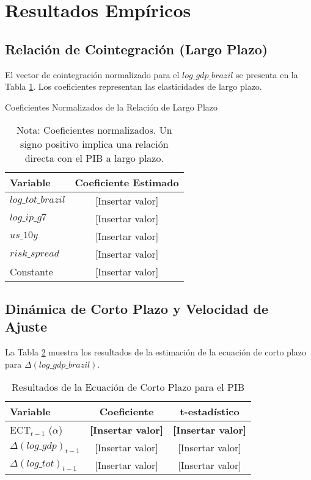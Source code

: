 \documentclass[12pt, a4paper]{article}
\begin{document}
\section{Resultados Empíricos}

\subsection{Relación de Cointegración (Largo Plazo)}
El vector de cointegración normalizado para el $log\_gdp\_brazil$ se presenta en la Tabla \ref{tab:long_run}. Los coeficientes representan las elasticidades de largo plazo.

\begin{table}[h!]
\centering
\caption{Coeficientes Normalizados de la Relación de Largo Plazo}
\label{tab:long_run}
\begin{tabular}{lc}
\toprule
\textbf{Variable} & \textbf{Coeficiente Estimado} \\
\midrule
$log\_tot\_brazil$ & [Insertar valor] \\
$log\_ip\_g7$      & [Insertar valor] \\
$us\_10y$          & [Insertar valor] \\
$risk\_spread$     & [Insertar valor] \\
Constante        & [Insertar valor] \\
\bottomrule
\end{tabular}
\caption*{Nota: Coeficientes normalizados. Un signo positivo implica una relación directa con el PIB a largo plazo.}
\end{table}


\subsection{Dinámica de Corto Plazo y Velocidad de Ajuste}
La Tabla \ref{tab:short_run} muestra los resultados de la estimación de la ecuación de corto plazo para $\Delta(log\_gdp\_brazil)$.

\begin{table}[h!]
\centering
\caption{Resultados de la Ecuación de Corto Plazo para el PIB}
\label{tab:short_run}
\begin{tabular}{lcc}
\toprule
\textbf{Variable} & \textbf{Coeficiente} & \textbf{t-estadístico} \\
\midrule
ECT$_{t-1}$ ($\alpha$) & \textbf{[Insertar valor]} & \textbf{[Insertar valor]} \\
$\Delta(log\_gdp)_{t-1}$ & [Insertar valor] & [Insertar valor] \\
$\Delta(log\_tot)_{t-1}$ & [Insertar valor] & [Insertar valor] \\
\bottomrule
\end{tabular}
\end{table}
\end{document}
